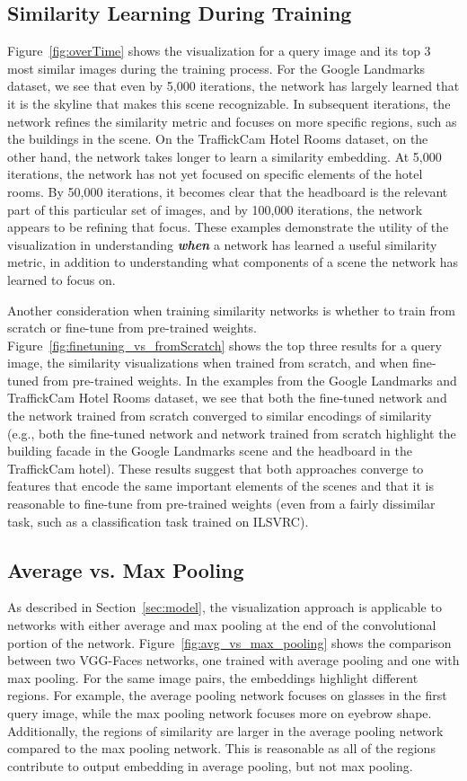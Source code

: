 \subsection{Similarity Learning During Training}
Figure~\ref{fig:overTime} shows the visualization for a query image and its top 3 most similar images during the training process. For the Google Landmarks dataset, we see that even by 5,000 iterations, the network has largely learned that it is 
the skyline that makes this scene recognizable. In subsequent iterations, the network refines the similarity metric and focuses on more specific regions, such as the buildings in the scene. On the TraffickCam Hotel Rooms dataset, on the other hand, the network takes longer to learn a similarity embedding. At 5,000 iterations, the network has not yet focused on specific elements of the hotel rooms. By 50,000 iterations, it becomes clear that the headboard is the relevant part of this particular set of images, and by 100,000 iterations, the network appears to be refining that focus. These examples demonstrate the utility of the visualization in understanding \textbf{\textit{when}} a network has learned a useful similarity metric, in addition to understanding what components of a scene the network has learned to focus on.

Another consideration when training similarity networks is whether to train from scratch or fine-tune from pre-trained weights. Figure~\ref{fig:finetuning_vs_fromScratch} shows the top three results for a query image, the similarity visualizations when trained from scratch, and when fine-tuned from pre-trained weights. In the examples from the Google Landmarks and TraffickCam Hotel Rooms dataset, we see that both the fine-tuned network and the network trained from scratch converged to similar encodings of similarity (e.g., both the fine-tuned network and network trained from scratch highlight the building facade in the Google Landmarks scene and the headboard in the TraffickCam hotel). These results suggest
that both approaches converge to features that encode the same important elements of the scenes and that it is reasonable to fine-tune from pre-trained weights (even from a fairly dissimilar task, such as a classification task trained on ILSVRC).

\subsection{Average vs. Max Pooling}

As described in Section~\ref{sec:model}, the visualization approach is applicable to networks with either average and max pooling at the end of the convolutional portion of the network. Figure~\ref{fig:avg_vs_max_pooling} shows the comparison between two VGG-Faces networks, one trained with average pooling and one with max pooling. 
For the same image pairs, the embeddings highlight different regions. For example, 
the average pooling network focuses on glasses in the first query image, while the max pooling network focuses more on eyebrow shape. Additionally, the regions of similarity are larger in the average pooling network compared to the max pooling network. This is reasonable as all of the regions contribute to output embedding in average pooling, but not max pooling. 


